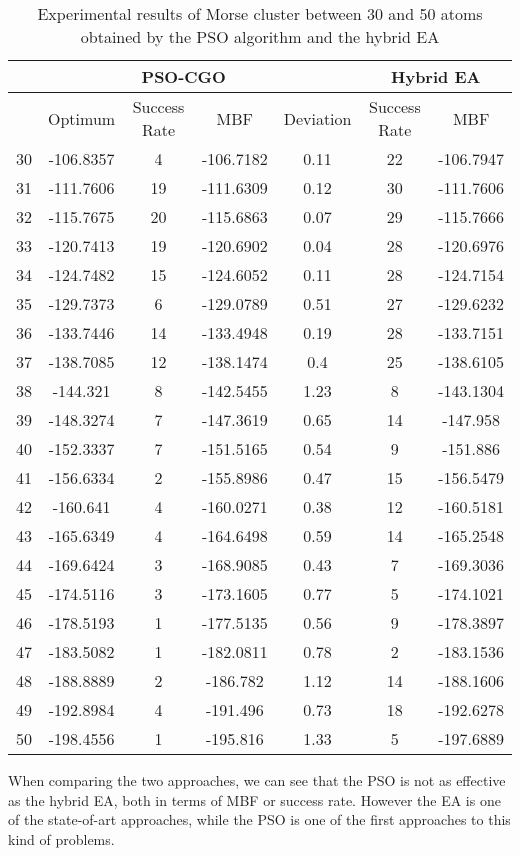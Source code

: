 	\begin{table}[!htdp]
		\label{tab:pso_results}
		\begin{center}
			\begin{tabular}{| c | c | c | c | c | c | c |}
				\hline
				\multicolumn{5}{|c|}{PSO-CGO} & \multicolumn{2}{c|}{Hybrid EA}\\ \hline 
				~ & Optimum & Success Rate & MBF & Deviation & Success Rate & MBF \\ \hline 
				30 & -106.8357 & 4 & -106.7182 & 0.11 & 22 & -106.7947 \\ \hline 
				31 & -111.7606 & 19 & -111.6309 & 0.12 & 30 & -111.7606 \\ \hline 
				32 & -115.7675 & 20 & -115.6863 & 0.07 & 29 & -115.7666 \\ \hline 
				33 & -120.7413 & 19 & -120.6902 & 0.04 & 28 & -120.6976 \\ \hline 
				34 & -124.7482 & 15 & -124.6052 & 0.11 & 28 & -124.7154 \\ \hline 
				35 & -129.7373 & 6 & -129.0789 & 0.51 & 27 & -129.6232 \\ \hline 
				36 & -133.7446 & 14 & -133.4948 & 0.19 & 28 & -133.7151 \\ \hline 
				37 & -138.7085 & 12 & -138.1474 & 0.4 & 25 & -138.6105 \\ \hline 
				38 & -144.321 & 8 & -142.5455 & 1.23 & 8 & -143.1304 \\ \hline 
				39 & -148.3274 & 7 & -147.3619 & 0.65 & 14 & -147.958 \\ \hline 
				40 & -152.3337 & 7 & -151.5165 & 0.54 & 9 & -151.886 \\ \hline 
				41 & -156.6334 & 2 & -155.8986 & 0.47 & 15 & -156.5479 \\ \hline 
				42 & -160.641 & 4 & -160.0271 & 0.38 & 12 & -160.5181 \\ \hline 
				43 & -165.6349 & 4 & -164.6498 & 0.59 & 14 & -165.2548 \\ \hline 
				44 & -169.6424 & 3 & -168.9085 & 0.43 & 7 & -169.3036 \\ \hline 
				45 & -174.5116 & 3 & -173.1605 & 0.77 & 5 & -174.1021 \\ \hline 
				46 & -178.5193 & 1 & -177.5135 & 0.56 & 9 & -178.3897 \\ \hline 
				47 & -183.5082 & 1 & -182.0811 & 0.78 & 2 & -183.1536 \\ \hline 
				48 & -188.8889 & 2 & -186.782 & 1.12 & 14 & -188.1606 \\ \hline 
				49 & -192.8984 & 4 & -191.496 & 0.73 & 18 & -192.6278 \\ \hline 
				50 & -198.4556 & 1 & -195.816 & 1.33 & 5 & -197.6889 \\ \hline 
			\end{tabular}
		\end{center}
		\caption{Experimental results of Morse cluster between 30 and 50 atoms obtained by the PSO algorithm and the hybrid EA }
	\end{table}
	When comparing the two approaches, we can see that the PSO is not as effective as the hybrid EA, both in terms of MBF or success rate. However the EA is one of the state-of-art approaches, while the PSO is one of the first approaches to this kind of problems.
	
	
	
	
	
	
	
